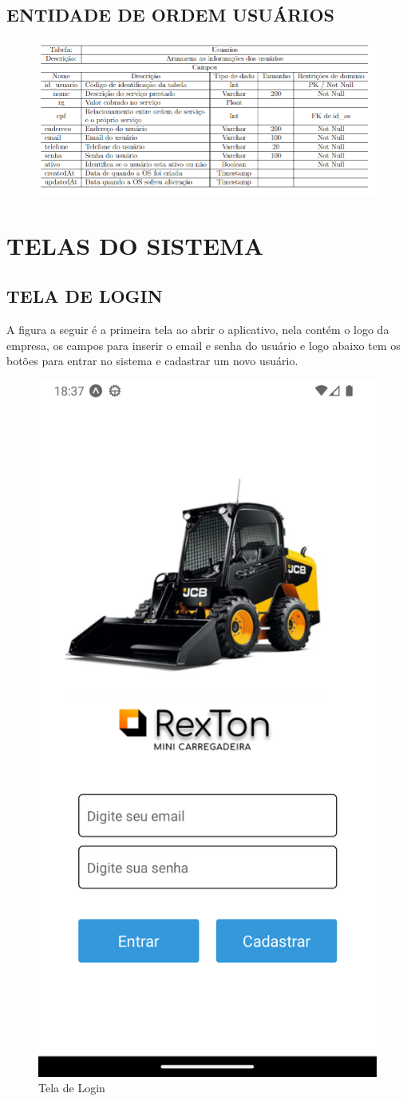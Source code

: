 \newpage
\subsection{ENTIDADE DE ORDEM USUÁRIOS}
\begin{figure}[htb]
	\begin{center}
	    \includegraphics[width=0.8\linewidth]{imagens/dc5.png}
	\end{center}
\end{figure}


\newpage
\section{TELAS DO SISTEMA}
\subsection{TELA DE LOGIN}
A figura a seguir é a primeira tela ao abrir o aplicativo, nela contém o logo da empresa, os campos para inserir o email e senha do usuário e logo abaixo tem os botões para entrar no sistema e cadastrar um novo usuário.
\begin{figure}[htb]
	\caption{\label{fig_diagrama-classes} Tela de Login}
	\begin{center}
	    \includegraphics[width=0.5\linewidth]{imagens/login.png}
	\end{center}
\end{figure}

